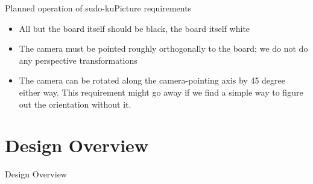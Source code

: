 \documentclass[10pt]{beamer}
\begin{document}
\begin{frame}{Planned operation of sudo-ku}{Picture requirements}
\begin{itemize}
\item All but the board itself should be black, the board itself white
\item The camera must be pointed roughly orthogonally to the board; we do not do any perspective transformations
\item The camera can be rotated along the camera-pointing axis by 45 degree either way. This requirement might go away if we find a simple way to figure out the orientation without it.
\end{itemize}
\end{frame}

\section{Design Overview}
\begin{frame}{Design Overview}
\end{frame}


\end{document}
